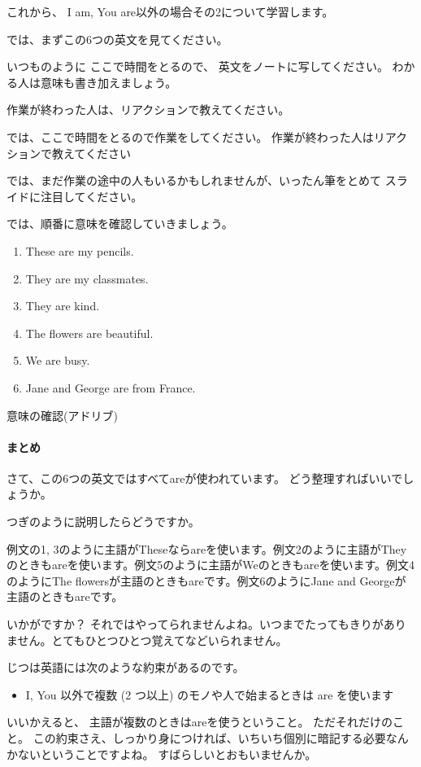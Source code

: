 \documentclass[book,jafontscale=0.9247]{jlreq}
\newcommand{\mySagyo}{%
\par%
\bigskip
では、ここで時間をとるので作業をしてください。
作業が終わった人はリアクションで教えてください\par%
\begin{minipage}[t]{.98\textwidth}
\mbox{}\hrulefill\mbox{}\par%
\mbox{}\hfill{}\raisebox{-.5\height}{作業}\hfill\mbox{}\par%
\mbox{}\hrulefill\mbox{}
\end{minipage}%
\par%
\bigskip%
では、まだ作業の途中の人もいるかもしれませんが、いったん筆をとめて
スライドに注目してください。%
\par%
\bigskip
}
\newcommand{\myMouse}{%
  {\large \ComputerMouse}
}
\begin{document}
これから、
I am, You are以外の場合その2について学習します。%


では、まずこの6つの英文を見てください。

いつものように
ここで時間をとるので、
英文をノートに写してください。
わかる人は意味も書き加えましょう。

作業が終わった人は、リアクションで教えてください。

\mySagyo

では、順番に意味を確認していきましょう。

\begin{enumerate}
 \item These are my pencils.
 \item They are my classmates.
 \item They are kind.
 \item The flowers are beautiful.
 \item We are busy.
 \item Jane and George are from France.
\end{enumerate}

意味の確認(アドリブ)

\paragraph{まとめ}

さて、この6つの英文ではすべてareが使われています。
どう整理すればいいでしょうか。

つぎのように説明したらどうですか。

例文の1, 3のように主語がTheseならareを使います。例文2のように主語がTheyのときもareを使います。例文5のように主語がWeのときもareを使います。例文4のようにThe flowersが主語のときもareです。例文6のようにJane and Georgeが主語のときもareです。

いかがですか？
それではやってられませんよね。いつまでたってもきりがありません。とてもひとつひとつ覚えてなどいられません。

じつは英語には次のような約束があるのです。

\myMouse

\begin{itemize}
 \item I, You 以外で複数 (2 つ以上) のモノや人で始まるときは are を使います
\end{itemize}

いいかえると、
主語が複数のときはareを使うということ。
ただそれだけのこと。
この約束さえ、しっかり身につければ、いちいち個別に暗記する必要なんかないということですよね。
すばらしいとおもいませんか。
\end{document}
